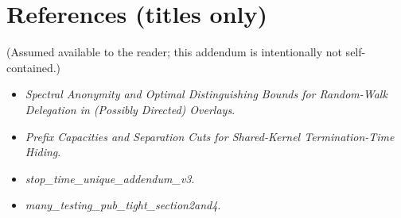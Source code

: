 \documentclass[11pt]{article}
\theoremstyle{definition}
\theoremstyle{remark}
\begin{document}
\section*{References (titles only)}
{\small (Assumed available to the reader; this addendum is intentionally not self-contained.)}
\begin{itemize}[leftmargin=*]
\item \emph{Spectral Anonymity and Optimal Distinguishing Bounds for Random-Walk Delegation in (Possibly Directed) Overlays}.
\item \emph{Prefix Capacities and Separation Cuts for Shared-Kernel Termination-Time Hiding}.
\item \emph{stop\_time\_unique\_addendum\_v3}.
\item \emph{many\_testing\_pub\_tight\_section2and4}.
\end{itemize}
\end{document}
